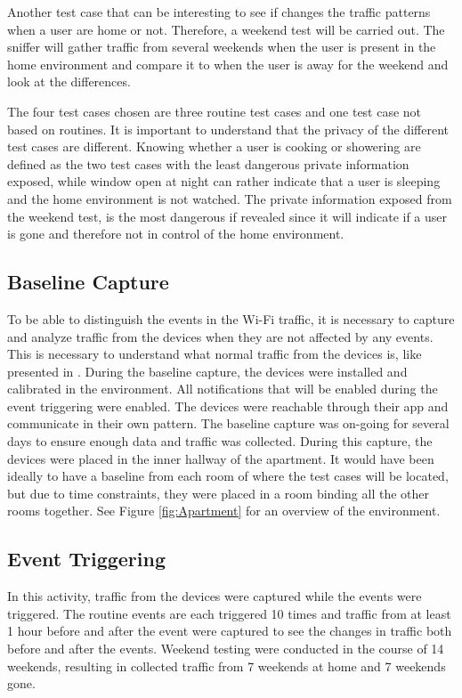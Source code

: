 Another test case that can be interesting to see if changes the traffic patterns when a user are home or not. Therefore, a weekend test will be carried out. The sniffer will gather traffic from several weekends when the user is present in the home environment and compare it to when the user is away for the weekend and look at the differences.

The four test cases chosen are three routine test cases and one test case not based on routines. It is important to understand that the privacy of the different test cases are different. Knowing whether a user is cooking or showering are defined as the two test cases with the least dangerous private information exposed, while window open at night can rather indicate that a user is sleeping and the home environment is not watched. The private information exposed from the weekend test, is the most dangerous if revealed since it will indicate if a user is gone and therefore not in control of the home environment.

\subsection{Baseline Capture}
To be able to distinguish the events in the \gls{Wi-Fi} traffic, it is necessary to capture and analyze traffic from the devices when they are not affected by any events. This is necessary to understand what normal traffic from the devices is, like presented in \cite{NetAna}. During the baseline capture, the devices were installed and calibrated in the environment. All notifications that will be enabled during the event triggering were enabled. The devices were reachable through their app and communicate in their own pattern. The baseline capture was on-going for several days to ensure enough data and traffic was collected. During this capture, the devices were placed in the inner hallway of the apartment. It would have been ideally to have a baseline from each room of where the test cases will be located, but due to time constraints, they were placed in a room binding all the other rooms together. See Figure \ref{fig:Apartment} for an overview of the environment.

\subsection{Event Triggering}
In this activity, traffic from the devices were captured while the events were triggered. The routine events are each triggered 10 times and traffic from at least 1 hour before and after the event were captured to see the changes in traffic both before and after the events. Weekend testing were conducted in the course of 14 weekends, resulting in collected traffic from 7 weekends at home and 7 weekends gone. 

